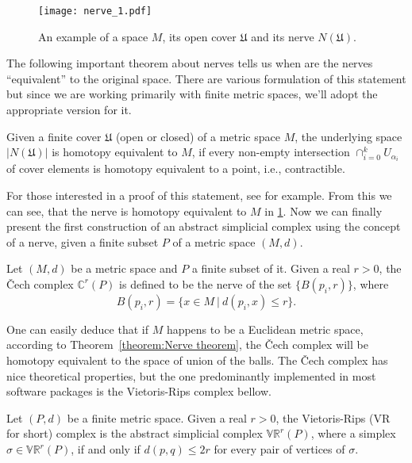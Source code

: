 \begin{figure}[h!]
  \centering
  \texttt{[image: nerve\_1.pdf]}
  \caption{An example of a space $M$, its open cover $\mathfrak{U}$ and its nerve $N(\mathfrak{U})$.}
  \label{fig:nerve_1}
\end{figure}

The following important theorem about nerves tells us when are the nerves ``equivalent'' to the original space. There are various formulation of this statement but since we are working primarily with finite metric spaces, we'll adopt the appropriate version for it.

\begin{theorem}
  Given a finite cover $\mathfrak{U}$ (open or closed) of a metric space $M$, the underlying space $|N(\mathfrak{U})|$ is homotopy equivalent to $M$, if every non-empty intersection $\cap_{i=0}^{k}U_{\alpha_{i}}$ of cover elements is homotopy equivalent to a point, i.e., contractible.
\label{theorem:Nerve theorem}
\end{theorem}

For those interested in a proof of this statement, see \cite{Borsuk1948OnTI} for example. From this we can see, that the nerve is homotopy equivalent to $M$ in \ref{fig:nerve_1}. Now we can finally present the first construction of an abstract simplicial complex using the concept of a nerve, given a finite subset $P$ of a metric space $(M,d)$.

\begin{definition}
  Let $(M,d)$ be a metric space and $P$ a finite subset of it. Given a real $r > 0$, the Čech complex $\mathbb{C}^{r}(P)$ is defined to be the nerve of the set $\{B(p_{i},r)\}$, where
  \begin{equation*}
    B(p_{i},r) = \{x \in M \: \vert \: d(p_{i},x) \leq r \}.
  \end{equation*}
\end{definition}

One can easily deduce that if $M$ happens to be a Euclidean metric space, according to Theorem~\ref{theorem:Nerve theorem}, the Čech complex will be homotopy equivalent to the space of union of the balls. The Čech complex has nice theoretical properties, but the one predominantly implemented in most software packages is the Vietoris-Rips complex bellow.

\begin{definition}
  Let $(P,d)$ be a finite metric space. Given a real $r>0$, the Vietoris-Rips (VR for short) complex is the abstract simplicial complex $\mathbb{VR}^{r}(P)$, where a simplex $\sigma \in \mathbb{VR}^{r}(P)$, if and only if $d(p,q) \leq 2r$ for every pair of vertices of $\sigma$.
\end{definition}

